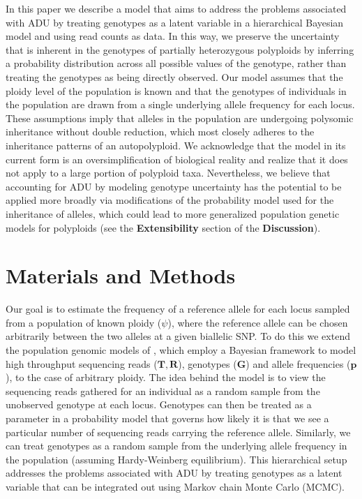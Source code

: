 \documentclass[11pt,english,letterpaper,oneside]{article}
\begin{document}
In this paper we describe a model that aims to address the problems associated with ADU by treating genotypes as a latent variable in a hierarchical Bayesian model and using read counts as data. In this way, we preserve the uncertainty that is inherent in the genotypes of partially heterozygous polyploids by inferring a probability distribution across all possible values of the genotype, rather than treating the genotypes as being directly observed. Our model assumes that the ploidy level of the population is known and that the genotypes of individuals in the population are drawn from a single underlying allele frequency for each locus. These assumptions imply that alleles in the population are undergoing polysomic inheritance without double reduction, which most closely adheres to the inheritance patterns of an autopolyploid. We acknowledge that the model in its current form is an oversimplification of biological reality and realize that it does not apply to a large portion of polyploid taxa. Nevertheless, we believe that accounting for ADU by modeling genotype uncertainty has the potential to be applied more broadly via modifications of the probability model used for the inheritance of alleles, which could lead to more generalized population genetic models for polyploids (see the \textbf{Extensibility} section of the \textbf{Discussion}). 
\medskip

\section*{Materials and Methods}        %

\noindent Our goal is to estimate the frequency of a reference allele for each locus sampled from a population of known ploidy ($\psi$), where the reference allele can be chosen arbitrarily between the two alleles at a given biallelic SNP. To do this we extend the population genomic models of \cite{buerkle2013popModels}, which employ a Bayesian framework to model high throughput sequencing reads ($\bm{T},\bm{R}$), genotypes ($\bm{G}$) and allele frequencies ($\bm{p}$), to the case of arbitrary ploidy. The idea behind the model is to view the sequencing reads gathered for an individual as a random sample from the unobserved genotype at each locus. Genotypes can then be treated as a parameter in a probability model that governs how likely it is that we see a particular number of sequencing reads carrying the reference allele. Similarly, we can treat genotypes as a random sample from the underlying allele frequency in the population (assuming Hardy-Weinberg equilibrium). This hierarchical setup addresses the problems associated with ADU by treating genotypes as a latent variable that can be integrated out using Markov chain Monte Carlo (MCMC).
\medskip
\end{document}
